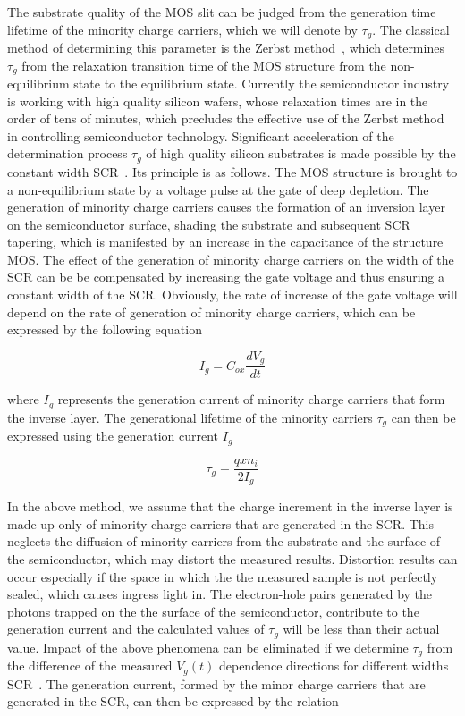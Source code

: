 The substrate quality of the MOS slit can be judged from the
generation time lifetime of the minority charge carriers, which we
will denote by $\tau_g$. The classical method of determining this
parameter is the Zerbst method~\cite{3.2}, which determines $\tau_g$
from the relaxation transition time of the MOS structure from the
non-equilibrium state to the equilibrium state. Currently the
semiconductor industry is working with high quality silicon wafers,
whose relaxation times are in the order of tens of minutes, which
precludes the effective use of the Zerbst method in controlling
semiconductor technology. Significant acceleration of the
determination process $\tau_g$ of high quality silicon substrates is
made possible by the constant width SCR~\cite{3.1}. Its principle is
as follows. The MOS structure is brought to a non-equilibrium state by
a voltage pulse at the gate of deep depletion. The generation of
minority charge carriers causes the formation of an inversion layer on
the semiconductor surface, shading the substrate and subsequent SCR
tapering, which is manifested by an increase in the capacitance of the
structure MOS\@. The effect of the generation of minority charge
carriers on the width of the SCR can be be compensated by increasing
the gate voltage and thus ensuring a constant width of the
SCR\@. Obviously, the rate of increase of the gate voltage will depend
on the rate of generation of minority charge carriers, which can be
expressed by the following equation~\cite{3.3}

\begin{equation}\label{eq:3.4}
  I_g = C_{ox} \frac{dV_g}{dt}
\end{equation}

where $I_g$ represents the generation current of minority charge carriers that
form the inverse layer.  The generational lifetime of the minority carriers
$\tau_g$ can then be expressed using the generation current $I_g$~\cite{3.3}

\begin{equation}\label{eq:3.5}
  \tau_g = \frac{qxn_i}{2I_g}
\end{equation}

In the above method, we assume that the charge increment in the
inverse layer is made up only of minority charge carriers that are
generated in the SCR\@. This neglects the diffusion of minority
carriers from the substrate and the surface of the semiconductor,
which may distort the measured results. Distortion results can occur
especially if the space in which the the measured sample is not
perfectly sealed, which causes ingress light in. The electron-hole
pairs generated by the photons trapped on the the surface of the
semiconductor, contribute to the generation current and the calculated
values of $\tau_g$ will be less than their actual value.  Impact of
the above phenomena can be eliminated if we determine $\tau_g$ from
the difference of the measured $V_g(t)$ dependence directions for
different widths SCR~\cite{3.3, 3.10, 3.11, 3.12}. The generation
current, formed by the minor charge carriers that are generated in the
SCR, can then be expressed by the relation

